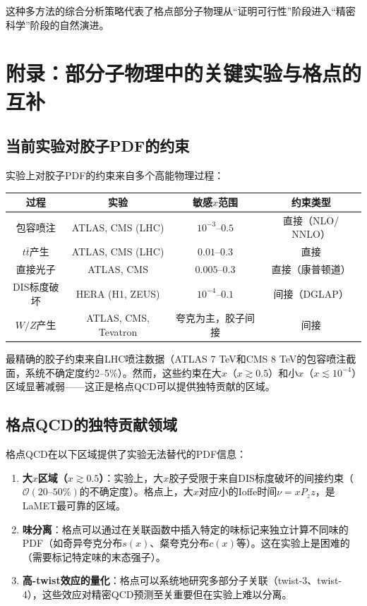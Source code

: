 \documentclass[11pt,a4paper]{ctexart}
\newcommand{\order}[1]{\mathcal{O}(#1)}
\begin{document}
这种多方法的综合分析策略代表了格点部分子物理从``证明可行性''阶段进入``精密科学''阶段的自然演进。

\section{附录：部分子物理中的关键实验与格点的互补}

\subsection{当前实验对胶子PDF的约束}

实验上对胶子PDF的约束来自多个高能物理过程：

\begin{center}
\begin{tabular}{c c c c}
\toprule
\textbf{过程} & \textbf{实验} & \textbf{敏感$x$范围} & \textbf{约束类型} \\
\midrule
包容喷注 & ATLAS, CMS (LHC) & $10^{-3} \text{--} 0.5$ & 直接（NLO/ NNLO） \\
$t\bar{t}$产生 & ATLAS, CMS (LHC) & $0.01 \text{--} 0.3$ & 直接 \\
直接光子 & ATLAS, CMS & $0.005 \text{--} 0.3$ & 直接（康普顿道） \\
DIS标度破坏 & HERA (H1, ZEUS) & $10^{-4} \text{--} 0.1$ & 间接（DGLAP） \\
$W/Z$产生 & ATLAS, CMS, Tevatron & 夸克为主，胶子间接 & 间接 \\
\bottomrule
\end{tabular}
\end{center}

最精确的胶子约束来自LHC喷注数据（ATLAS 7 TeV和CMS 8 TeV的包容喷注截面，系统不确定度约2--5\%）。然而，这些约束在大$x$（$x \gtrsim 0.5$）和小$x$（$x \lesssim 10^{-4}$）区域显著减弱——这正是格点QCD可以提供独特贡献的区域。

\subsection{格点QCD的独特贡献领域}

格点QCD在以下区域提供了实验无法替代的PDF信息：

\begin{enumerate}
  \item \textbf{大$x$区域（$x \gtrsim 0.5$）}：实验上，大$x$胶子受限于来自DIS标度破坏的间接约束（$\order{20\text{--}50\%}$的不确定度）。格点上，大$x$对应小的Ioffe时间$\nu = x P_z z$，是LaMET最可靠的区域。

  \item \textbf{味分离}：格点可以通过在关联函数中插入特定的味标记来独立计算不同味的PDF（如奇异夸克分布$s(x)$、粲夸克分布$c(x)$等）。这在实验上是困难的（需要标记特定味的末态强子）。

  \item \textbf{高-twist效应的量化}：格点可以系统地研究多部分子关联（twist-3、twist-4），这些效应对精密QCD预测至关重要但在实验上难以分离。
\end{enumerate}
\end{document}
